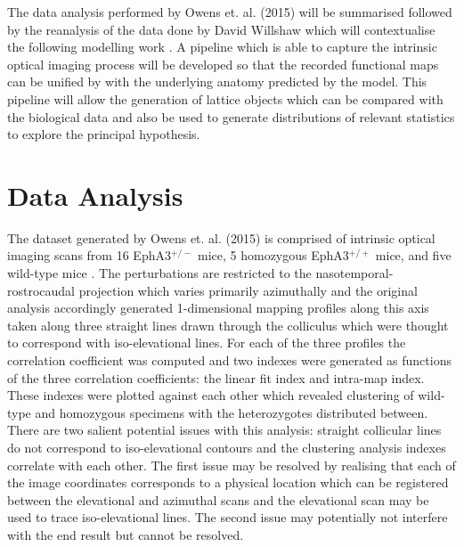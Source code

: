 The data analysis performed by Owens et. al. (2015) will be summarised followed by the reanalysis of the data done by David Willshaw which will contextualise the following modelling work \cite{Owens2015-zv}. A pipeline which is able to capture the intrinsic optical imaging process will be developed so that the recorded functional maps can be unified by with the underlying anatomy predicted by the model. This pipeline will allow the generation of lattice objects which can be compared with the biological data and also be used to generate distributions of relevant statistics to explore the principal hypothesis.
\section{Data Analysis \label{section:owensanalysis}}
The dataset generated by Owens et. al. (2015) is comprised of intrinsic optical imaging scans from 16 EphA3$^{+/-}$ mice, 5 homozygous EphA3$^{+/+}$ mice, and five wild-type mice \cite{Owens2015-zv}. The perturbations are restricted to the nasotemporal-rostrocaudal projection which varies primarily azimuthally and the original analysis accordingly generated 1-dimensional mapping profiles along this axis taken along three straight lines drawn through the colliculus which were thought to correspond with iso-elevational lines. For each of the three profiles the correlation coefficient was computed and two indexes were generated as functions of the three correlation coefficients: the linear fit index and intra-map index. These indexes were plotted against each other which revealed clustering of wild-type and homozygous specimens with the heterozygotes distributed between. There are two salient potential issues with this analysis: straight collicular lines do not correspond to iso-elevational contours and the clustering analysis indexes correlate with each other. The first issue may be resolved by realising that each of the image coordinates corresponds to a physical location which can be registered between the elevational and azimuthal scans and the elevational scan may be used to trace iso-elevational lines. The second issue may potentially not interfere with the end result but cannot be resolved.
